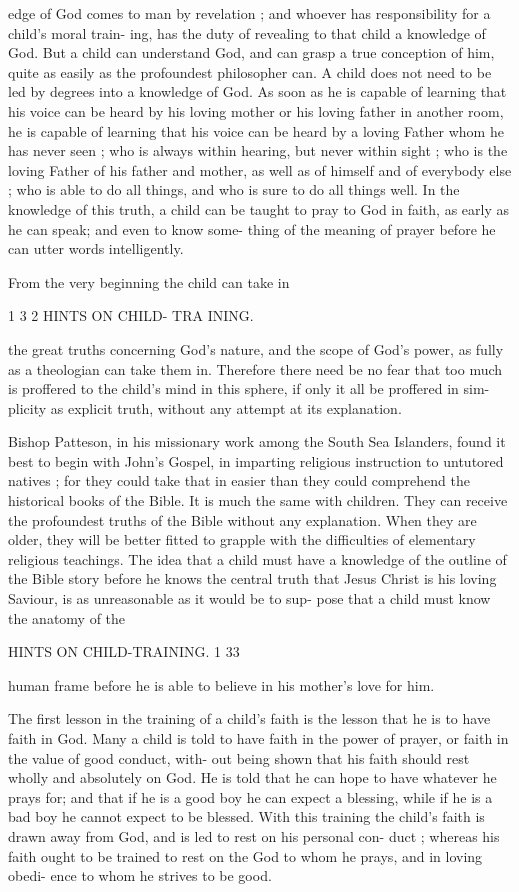 \documentclass[
]{book}
\begin{document}
edge of God comes to man by revelation ; and whoever has responsibility for a child's moral train- ing, has the duty of revealing to that child a knowledge of God. But a child can understand God, and can grasp a true conception of him, quite as easily as the profoundest philosopher can. A child does not need to be led by degrees into a knowledge of God. As soon as he is capable of learning that his voice can be heard by his loving mother or his loving father in another room, he is capable of learning that his voice can be heard by a loving Father whom he has never seen ; who is always within hearing, but never within sight ; who is the loving Father of his father and mother, as well as of himself and of everybody else ; who is able to do all things, and who is sure to do all things well. In the knowledge of this truth, a child can be taught to pray to God in faith, as early as he can speak; and even to know some- thing of the meaning of prayer before he can utter words intelligently.

From the very beginning the child can take in

1 3 2 HINTS ON CHILD- TRA INING.

the great truths concerning God's nature, and the scope of God's power, as fully as a theologian can take them in. Therefore there need be no fear that too much is proffered to the child's mind in this sphere, if only it all be proffered in sim- plicity as explicit truth, without any attempt at its explanation.

Bishop Patteson, in his missionary work among the South Sea Islanders, found it best to begin with John's Gospel, in imparting religious instruction to untutored natives ; for they could take that in easier than they could comprehend the historical books of the Bible. It is much the same with children. They can receive the profoundest truths of the Bible without any explanation. When they are older, they will be better fitted to grapple with the difficulties of elementary religious teachings. The idea that a child must have a knowledge of the outline of the Bible story before he knows the central truth that Jesus Christ is his loving Saviour, is as unreasonable as it would be to sup- pose that a child must know the anatomy of the

HINTS ON CHILD-TRAINING. 1 33

human frame before he is able to believe in his mother's love for him.

The first lesson in the training of a child's faith is the lesson that he is to have faith in God. Many a child is told to have faith in the power of prayer, or faith in the value of good conduct, with- out being shown that his faith should rest wholly and absolutely on God. He is told that he can hope to have whatever he prays for; and that if he is a good boy he can expect a blessing, while if he is a bad boy he cannot expect to be blessed. With this training the child's faith is drawn away from God, and is led to rest on his personal con- duct ; whereas his faith ought to be trained to rest on the God to whom he prays, and in loving obedi- ence to whom he strives to be good.
\end{document}
